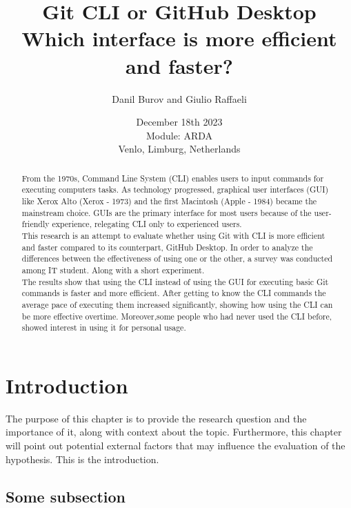 \documentclass[]{report}
\title{Git CLI or GitHub Desktop \\ Which interface is more efficient and faster?}
\author{Danil Burov and Giulio Raffaeli}
\date{December 18th 2023\\Module: ARDA \\Venlo, Limburg, Netherlands}
\begin{document}
	
	\maketitle
	
	\begin{abstract}
		From the 1970s, Command Line System (CLI) enables users to input commands for executing computers tasks. As technology progressed, graphical user interfaces (GUI) like Xerox Alto (Xerox - 1973) and the first Macintosh (Apple - 1984) became the mainstream choice. GUIs are the primary interface for most users because of the user-friendly experience, relegating CLI only to experienced users.\\
		This research is an attempt to evaluate whether using Git with CLI is more efficient and faster compared to its counterpart, GitHub Desktop. In order to analyze the  differences between the effectiveness of using one or the other, a survey was conducted among IT student. Along with a short experiment.\\		
		The results show that using the CLI instead of using the GUI for executing basic Git commands is faster and more efficient.   After getting to know the CLI commands the average pace of executing them increased significantly, showing how using the CLI can be more effective overtime. Moreover,some people who had never used the CLI before, showed interest in using it for personal usage.
		
	\end{abstract}
	\tableofcontents
	\setcounter{page}{3}
	\listoffigures %
	\pagebreak
	
	
	\section{Introduction}
	The purpose of this chapter is to provide the research question and the importance of it, along with context about the topic. Furthermore, this chapter will point out potential external factors that may influence the evaluation of the hypothesis. 
	This is the introduction.
	\subsection{Some subsection}
	
\end{document}
